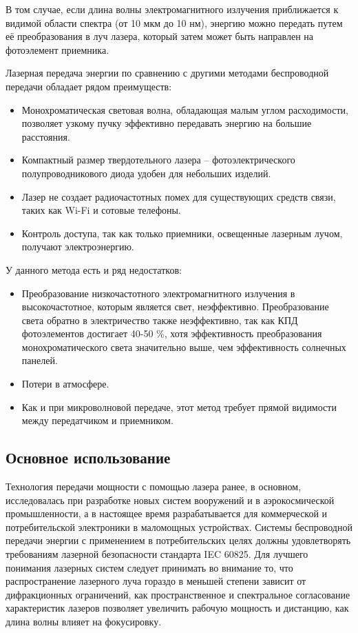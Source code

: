 \documentclass[14pt,pscyr,titlepage]{hedreport}
\begin{document}
		В том случае, если длина волны электромагнитного излучения 
		приближается к видимой области спектра (от 10 мкм до 10 нм), 
		энергию можно передать путем её преобразования в луч лазера, который 
		затем может быть направлен на фотоэлемент приемника.

		Лазерная передача энергии по сравнению с другими методами беспроводной 
		передачи обладает рядом преимуществ:
		\begin{itemize}\itemsep-2pt
			\item Монохроматическая световая волна, обладающая малым углом 
				расходимости, позволяет узкому пучку эффективно передавать 
				энергию на большие расстояния.
			\item Компактный размер твердотельного лазера -- 
				фотоэлектрического полупроводникового диода удобен для 
				небольших изделий.
			\item Лазер не создает радиочастотных помех для существующих 
				средств связи, таких как Wi-Fi и сотовые телефоны.
			\item Контроль доступа, так как только приемники, освещенные 
				лазерным лучом, получают электроэнергию.
		\end{itemize}

		У данного метода есть и ряд недостатков:
		\begin{itemize}\itemsep-2pt
			\item Преобразование низкочастотного электромагнитного излучения 
				в высокочастотное, которым является свет, неэффективно. 
				Преобразование света обратно в электричество также неэффективно, 
				так как КПД фотоэлементов достигает 40-50 \%, хотя 
				эффективность преобразования монохроматического света 
				значительно выше, чем эффективность солнечных панелей.
			\item Потери в атмосфере.
			\item Как и при микроволновой передаче, этот метод требует прямой 
				видимости между передатчиком и приемником.
		\end{itemize}

	\subsection{Основное использование}
		Технология передачи мощности с помощью лазера ранее, в основном, 
		исследовалась при разработке новых систем вооружений и в 
		аэрокосмической промышленности, а в настоящее время разрабатывается 
		для коммерческой и потребительской электроники в маломощных 
		устройствах. Системы беспроводной передачи энергии с применением в 
		потребительских целях должны удовлетворять требованиям лазерной 
		безопасности стандарта IEC 60825. Для лучшего понимания лазерных 
		систем следует принимать во внимание то, что распространение лазерного 
		луча гораздо в меньшей степени зависит от дифракционных ограничений, 
		как пространственное и спектральное согласование характеристик лазеров 
		позволяет увеличить рабочую мощность и дистанцию, как длина волны 
		влияет на фокусировку.
\end{document}
